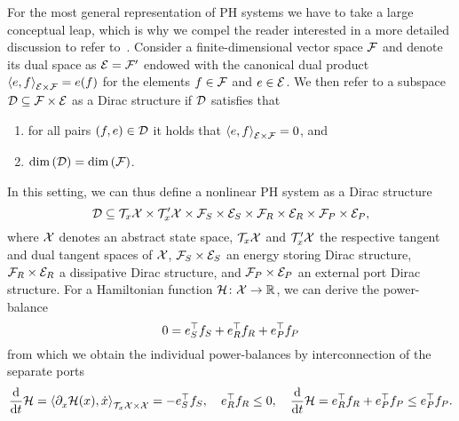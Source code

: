 \begin{remark}
    For the most general representation of \ac{PH} systems we have to take a large conceptual leap, which is why we compel the reader interested in a more detailed discussion to refer to~\cite[Section~2.2]{VanDerSchaft2014}.
    Consider a finite-dimensional vector space $\mathcal{F}$ and denote its dual space as $\mathcal{E} = \mathcal{F}'$ endowed with the canonical dual product ${\langle e, f \rangle}_{\mathcal{E} \times \mathcal{F}} = e(f)$ for the elements $f \in \mathcal{F}$ and $e \in \mathcal{E}$.
    We then refer to a subspace $\mathcal{D} \subseteq \mathcal{F} \times \mathcal{E}$ as a Dirac structure if $\mathcal{D}$ satisfies that
    \begin{enumerate}
        \item for all pairs $(f, e) \in \mathcal{D}$ it holds that ${\langle e, f \rangle}_{\mathcal{E} \times \mathcal{F}} = 0$, and
        \item $\dim{(\mathcal{D})} = \dim{(\mathcal{F})}$.
    \end{enumerate}
    In this setting, we can thus define a nonlinear \ac{PH} system as a Dirac structure
    \begin{equation*}
        \mathcal{D} \subseteq \mathcal{T}_x \mathcal{X} \times \mathcal{T}'_x \mathcal{X} \times \mathcal{F}_S \times \mathcal{E}_S \times \mathcal{F}_R \times \mathcal{E}_R \times \mathcal{F}_P \times \mathcal{E}_P,
    \end{equation*}
    where $\mathcal{X}$ denotes an abstract state space, $\mathcal{T}_x \mathcal{X}$ and $\mathcal{T}'_x \mathcal{X}$ the respective tangent and dual tangent spaces of $\mathcal{X}$, $\mathcal{F}_S \times \mathcal{E}_S$ an energy storing Dirac structure, $\mathcal{F}_R \times \mathcal{E}_R$ a dissipative Dirac structure, and $\mathcal{F}_P \times \mathcal{E}_P$ an external port Dirac structure.
    For a Hamiltonian function $\mathcal{H} \colon \mathcal{X} \to \mathbb{R}$, we can derive the power-balance
    \begin{equation*}
        0 = e_S^{\top} f_S + e_R^{\top} f_R + e_P^{\top} f_P
    \end{equation*}
    from which we obtain the individual power-balances by interconnection of the separate ports
    \begin{equation*}
        \frac{\mathop{}\!\mathrm{d}}{\mathop{}\!\mathrm{d} t} \mathcal{H} = {\langle \partial_{x}^{} \mathcal{H}(x), \dot{x} \rangle}_{\mathcal{T}_x \mathcal{X} \times \mathcal{X}} = -e_S^{\top} f_S,\quad e_R^{\top} f_R \leq 0,\quad \frac{\mathop{}\!\mathrm{d}}{\mathop{}\!\mathrm{d} t} \mathcal{H} = e_R^{\top} f_R + e_P^{\top} f_P \leq e_P^{\top} f_P.
    \end{equation*}
\end{remark}
